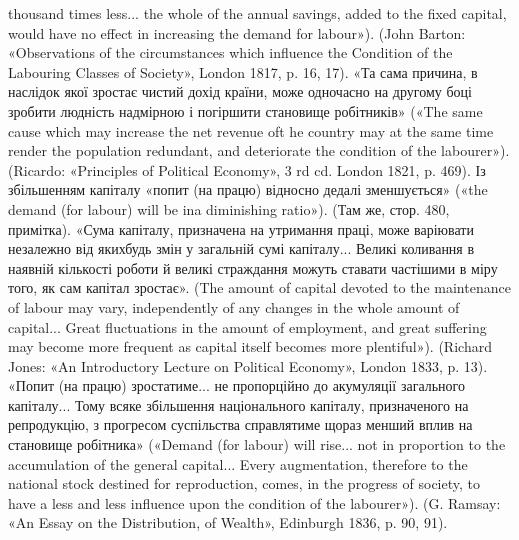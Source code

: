thousand times less... the whole of the annual savings, added to the fixed
capital, would have no effect in increasing the demand for labour»). (John
Barton: «Observations of the circumstances which influence the Condition
of the Labouring Classes of Society», London 1817, p. 16, 17). «Та
сама причина, в наслідок якої зростає чистий дохід країни, може одночасно
на другому боці зробити людність надмірною і погіршити становище
робітників» («The same cause which may increase the net revenue oft he country
may at the same time render the population redundant, and deteriorate
the condition of the labourer»). (Ricardo: «Principles of Political Economy»,
3 rd cd. London 1821, p. 469). Із збільшенням капіталу «попит (на
працю) відносно дедалі зменшується» («the demand (for labour) will be ina diminishing
ratio»). (Там же, стор. 480, примітка). «Сума капіталу, призначена
на утримання праці, може варіювати незалежно від якихбудь змін
у загальній сумі капіталу... Великі коливання в наявній кількості роботи
й великі страждання можуть ставати частішими в міру того, як сам капітал
зростає». (The amount of capital devoted to the maintenance of labour
may vary, independently of any changes in the whole amount of capital...
Great fluctuations in the amount of employment, and great suffering may
become more frequent as capital itself becomes more plentiful»). (Richard
Jones: «An Introductory Lecture on Political Economy», London 1833, p. 13).
«Попит (на працю) зростатиме... не пропорційно до акумуляції загального
капіталу... Тому всяке збільшення національного капіталу, призначеного
на репродукцію, з прогресом суспільства справлятиме щораз
менший вплив на становище робітника» («Demand (for labour) will rise...
not in proportion to the accumulation of the general capital... Every
augmentation, therefore to the national stock destined for reproduction,
comes, in the progress of society, to have a less and less influence upon the
condition of the labourer»). (G. Ramsay: «An Essay on the Distribution,
of Wealth», Edinburgh 1836, p. 90, 91).
